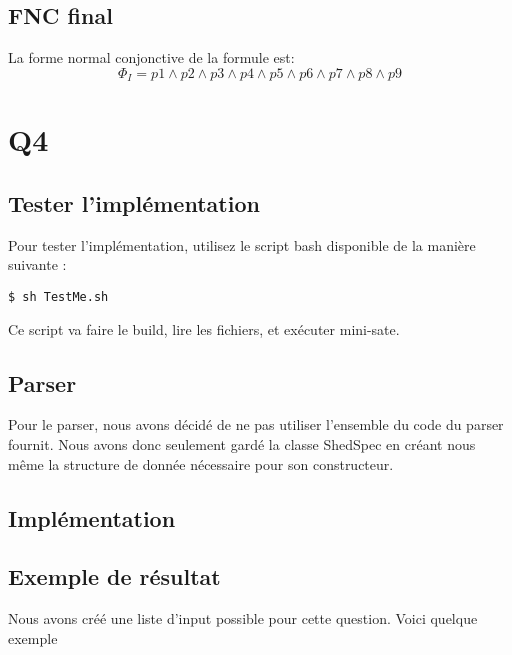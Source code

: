 \documentclass[a4paper,11pt]{article}
\begin{document}
\subsection{FNC final}
La forme normal conjonctive de la formule est:
\begin{displaymath}
\Phi_{I} = p1 \wedge p2 \wedge p3 \wedge p4 \wedge p5 \wedge p6 \wedge p7 \wedge p8 \wedge p9
\end{displaymath}

\section{Q4}
\subsection{Tester l'implémentation}
Pour tester l'implémentation, utilisez le script bash disponible de la manière suivante :
\begin{lstlisting}
$ sh TestMe.sh	
\end{lstlisting}
Ce script va faire le build, lire les fichiers, et exécuter mini-sate.

\subsection{Parser}
Pour le parser, nous avons décidé de ne pas utiliser l'ensemble du code du parser fournit. Nous avons donc seulement gardé la classe ShedSpec en créant nous même la structure de donnée nécessaire pour son constructeur.

\subsection{Implémentation}


\subsection{Exemple de résultat}
Nous avons créé une liste d'input possible pour cette question. Voici quelque exemple
\end{document}
